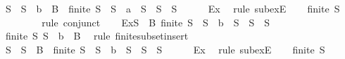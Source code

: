 \begin{isabellebody}
\ S{}\ \ {\isachardoublequoteopen}S{}\ {\isasymsubseteq}\ {\isacharbraceleft}b{\isacharbraceright}\ {\isasymunion}\ B{\isachardoublequoteclose}\ \ {}{\isacharcolon}{\isachardoublequoteopen}finite\ S{}\ {\isasymand}\ {\isacharparenleft}S\ {\isacharequal}\ {\isacharbraceleft}a{\isacharbraceright}\ {\isasymunion}\ S{}\ {\isasymor}\ S\ {\isacharequal}\ S{}{\isacharparenright}{\isachardoublequoteclose}\isanewline
\ \ \ \ \isamarkupfalse%
\ Ex{}\ \isamarkupfalse%
\ {\isacharparenleft}rule\ subexE{\isacharparenright}\isanewline
\ \ \isamarkupfalse%
\ {\isachardoublequoteopen}finite\ S{}{\isachardoublequoteclose}\isanewline
\ \ \ \ \isamarkupfalse%
\ {}\ \isamarkupfalse%
\ {\isacharparenleft}rule\ conjunct{}{\isacharparenright}\isanewline
\ \ \isamarkupfalse%
\ Ex{}{\isacharcolon}{\isachardoublequoteopen}{\isasymexists}S{}\ {\isasymsubseteq}\ B{\isachardot}\ finite\ S{}\ {\isasymand}\ {\isacharparenleft}S{}\ {\isacharequal}\ {\isacharbraceleft}b{\isacharbraceright}\ {\isasymunion}\ S{}\ {\isasymor}\ S{}\ {\isacharequal}\ S{}{\isacharparenright}{\isachardoublequoteclose}\isanewline
\ \ \ \ \isamarkupfalse%
\ {\isacartoucheopen}finite\ S{}{\isacartoucheclose}\ {\isacartoucheopen}S{}\ {\isasymsubseteq}\ {\isacharbraceleft}b{\isacharbraceright}\ {\isasymunion}\ B{\isacartoucheclose}\ \isamarkupfalse%
\ {\isacharparenleft}rule\ finite{\isacharunderscore}subset{\isacharunderscore}insert{}{\isacharparenright}\isanewline
\ \ \isamarkupfalse%
\ S{}\ \ {\isachardoublequoteopen}S{}\ {\isasymsubseteq}\ B{\isachardoublequoteclose}\ \ {}{\isacharcolon}{\isachardoublequoteopen}finite\ S{}\ {\isasymand}\ {\isacharparenleft}S{}\ {\isacharequal}\ {\isacharbraceleft}b{\isacharbraceright}\ {\isasymunion}\ S{}\ {\isasymor}\ S{}\ {\isacharequal}\ S{}{\isacharparenright}{\isachardoublequoteclose}\isanewline
\ \ \ \ \isamarkupfalse%
\ Ex{}\ \isamarkupfalse%
\ {\isacharparenleft}rule\ subexE{\isacharparenright}\isanewline
\ \ \isamarkupfalse%
\ {\isachardoublequoteopen}finite\ S{}{\isachardoublequoteclose}\isanewline

\end{isabellebody}
